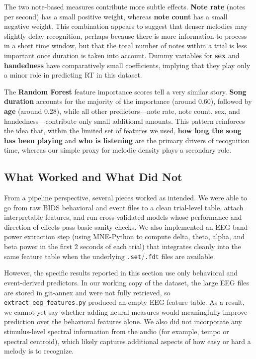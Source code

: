 \documentclass[11pt,a4paper]{article}
\begin{document}
The two note-based measures contribute more subtle effects. \textbf{Note rate} (notes per second) has a small positive weight, whereas \textbf{note count} has a small negative weight. This combination appears to suggest that denser melodies may slightly delay recognition, perhaps because there is more information to process in a short time window, but that the total number of notes within a trial is less important once duration is taken into account. Dummy variables for \textbf{sex} and \textbf{handedness} have comparatively small coefficients, implying that they play only a minor role in predicting RT in this dataset.

The \textbf{Random Forest} feature importance scores tell a very similar story. \textbf{Song duration} accounts for the majority of the importance (around 0.60), followed by \textbf{age} (around 0.28), while all other predictors---note rate, note count, sex, and handedness---contribute only small additional amounts. This pattern reinforces the idea that, within the limited set of features we used, \textbf{how long the song has been playing} and \textbf{who is listening} are the primary drivers of recognition time, whereas our simple proxy for melodic density plays a secondary role.

\subsection{What Worked and What Did Not}

From a pipeline perspective, several pieces worked as intended. We were able to go from raw BIDS behavioral and event files to a clean trial-level table, attach interpretable features, and run cross-validated models whose performance and direction of effects pass basic sanity checks. We also implemented an EEG band-power extraction step (using MNE-Python to compute delta, theta, alpha, and beta power in the first 2 seconds of each trial) that integrates cleanly into the same feature table when the underlying \texttt{.set}/\texttt{.fdt} files are available.

However, the specific results reported in this section use only behavioral and event-derived predictors. In our working copy of the dataset, the large EEG files are stored in git-annex and were not fully retrieved, so \texttt{extract\_eeg\_features.py} produced an empty EEG feature table. As a result, we cannot yet say whether adding neural measures would meaningfully improve prediction over the behavioral features alone. We also did not incorporate any stimulus-level spectral information from the audio (for example, tempo or spectral centroid), which likely captures additional aspects of how easy or hard a melody is to recognize.
\end{document}
